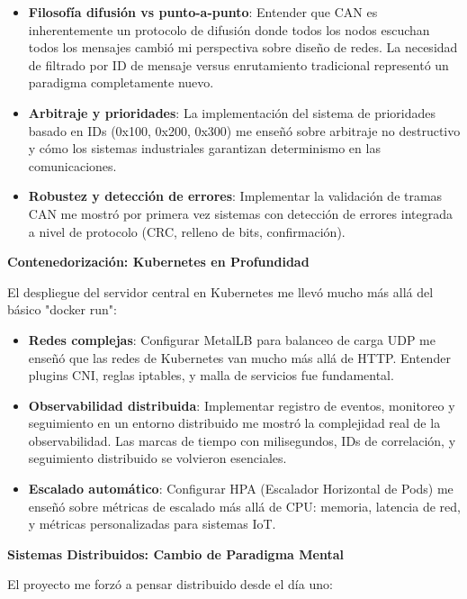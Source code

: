 \begin{itemize}
    \item \textbf{Filosofía difusión vs punto-a-punto}: Entender que CAN es inherentemente un protocolo de difusión donde todos los nodos escuchan todos los mensajes cambió mi perspectiva sobre diseño de redes. La necesidad de filtrado por ID de mensaje versus enrutamiento tradicional representó un paradigma completamente nuevo.
    
    \item \textbf{Arbitraje y prioridades}: La implementación del sistema de prioridades basado en IDs (0x100, 0x200, 0x300) me enseñó sobre arbitraje no destructivo y cómo los sistemas industriales garantizan determinismo en las comunicaciones.
    
    \item \textbf{Robustez y detección de errores}: Implementar la validación de tramas CAN me mostró por primera vez sistemas con detección de errores integrada a nivel de protocolo (CRC, relleno de bits, confirmación).
\end{itemize}

\textbf{Contenedorización: Kubernetes en Profundidad}

El despliegue del servidor central en Kubernetes me llevó mucho más allá del básico "docker run":

\begin{itemize}
    \item \textbf{Redes complejas}: Configurar MetalLB para balanceo de carga UDP me enseñó que las redes de Kubernetes van mucho más allá de HTTP. Entender plugins CNI, reglas iptables, y malla de servicios fue fundamental.
    
    \item \textbf{Observabilidad distribuida}: Implementar registro de eventos, monitoreo y seguimiento en un entorno distribuido me mostró la complejidad real de la observabilidad. Las marcas de tiempo con milisegundos, IDs de correlación, y seguimiento distribuido se volvieron esenciales.
    
    \item \textbf{Escalado automático}: Configurar HPA (Escalador Horizontal de Pods) me enseñó sobre métricas de escalado más allá de CPU: memoria, latencia de red, y métricas personalizadas para sistemas IoT.
\end{itemize}

\textbf{Sistemas Distribuidos: Cambio de Paradigma Mental}

El proyecto me forzó a pensar distribuido desde el día uno:

